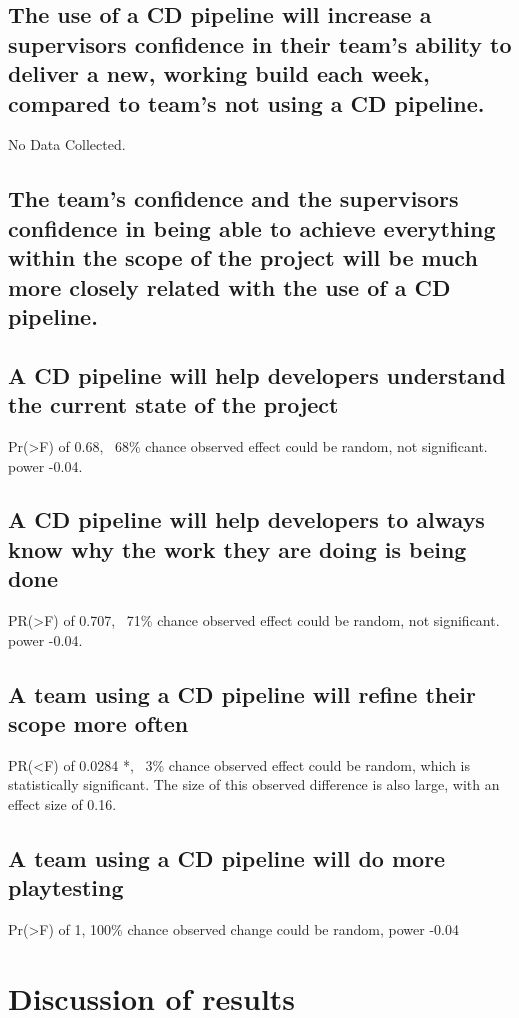 \documentclass[journal]{IEEEtran}
\begin{document}
    \subsection{The use of a CD pipeline will increase a supervisors confidence in their team's ability to deliver a new, working build each week, compared to team's not using a CD pipeline.}
    No Data Collected.

    \subsection{The team's confidence and the supervisors confidence in being able to achieve everything within the scope of the project will be much more closely related with the use of a CD pipeline.}


    \subsection{A CD pipeline will help developers understand the current state of the project}
    Pr(>F) of 0.68, ~68\% chance observed effect could be random, not significant. power -0.04.

    \subsection{A CD pipeline will help developers to always know why the work they are doing is being done}
    PR(>F) of 0.707, ~71\% chance observed effect could be random, not significant. power -0.04.

    \subsection{A team using a CD pipeline will refine their scope more often}
        PR(<F) of 0.0284 *, ~3\% chance observed effect could be random, which is statistically significant. The size of this observed difference is also large, with an effect size of 0.16.

    \subsection{A team using a CD pipeline will do more playtesting}
        Pr(>F) of 1, 100\% chance observed change could be random, power -0.04

\section{Discussion of results}
\end{document}
